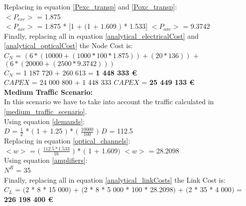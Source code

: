 Replacing in equation \ref{Pexc_transp} and \ref{Poxc_transp}:\\

$<P_{exc}>$ = 1.875\\

$<P_{oxc}>$ = 1.875 * $[$1 + $($1 + $1.609$ $)$ * 1.533$]$ \qquad \quad $<P_{oxc}>$ = 9.3742 \\

Finally, replacing all in equation \ref{analytical_electricalCost} and \ref{analytical_opticalCost} the Node Cost is:\\

$C_N$ = $\left(6 * (10 000 + (1 000 * 100 * 1.875)) + (20 * 136)\right)$ + $\left(6*(20 000 + (2 500 * 9.3742 ) ) \right)$\\

$C_N$ = 1 187 720 + 260 613 = \textbf{1 448 333 \euro}\\

$CAPEX$ = 24 000 800 + 1 448 333 \qquad \qquad $CAPEX$ = \textbf{25 449 133 \euro}\\

\textbf{Medium Traffic Scenario:}\\

In this scenario we have to take into account the traffic calculated in \ref{medium_traffic_scenario}.\\

Using equation \ref{demands}:\\

$D$ = $\frac{1}{2}$ * $($ 1 + 1.25 $)$ * $($ $\frac{10000}{100}$ $)$ \qquad \qquad $D$ = 112.5\\

Replacing in equation \ref{optical_channels}:\\

$<w>$ = $($ $\frac{112.5 * 1.533}{16}$ $)$ * $($ 1 + 1.609$)$ \qquad \qquad $<w>$ = 28.2098\\

Using equation \ref{amplifiers}:\\

$N^R$ = 35\\

Finally, replacing all in equation \ref{analytical_linkCosts} the Link Cost is:\\

$C_L$ = $($2 * 8 * 15 000$)$ + $($2 * 8 * 5 000 * 100 * 28.2098$)$ + $($2 * 35 * 4 000$)$ = \textbf{226 198 400 \euro}\\

